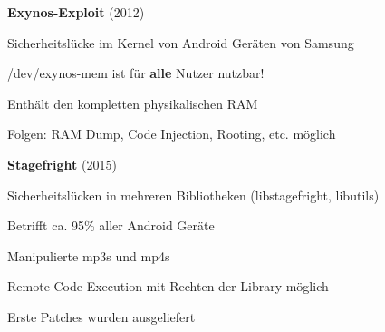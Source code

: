 \begin{frame}
	\textbf{Exynos-Exploit} (2012)
	\begin{block}{}
		Sicherheitslücke im Kernel von Android Geräten von Samsung
	\end{block}		
	\begin{block}{}
		/dev/exynos-mem ist für \textbf{alle} Nutzer nutzbar!
	\end{block}
	\begin{block}{}
		Enthält den kompletten physikalischen RAM
	\end{block}
	\begin{block}{}
		Folgen: RAM Dump, Code Injection, Rooting, etc. möglich
	\end{block}
\end{frame}
\begin{frame}
	\textbf{Stagefright} (2015)
	\begin{block}{}
		Sicherheitslücken in mehreren Bibliotheken (libstagefright, libutils)
	\end{block}		
	\begin{block}{}
		Betrifft ca. 95\% aller Android Geräte
	\end{block}
	\begin{block}{}
		Manipulierte mp3s und mp4s
	\end{block}
	\begin{block}{}
		Remote Code Execution mit Rechten der Library möglich						
	\end{block}
	\begin{block}{}
		Erste Patches wurden ausgeliefert
	\end{block}
\end{frame}